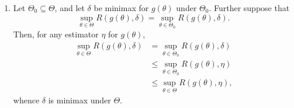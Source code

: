 \documentclass[11pt]{article}
\begin{document}
\begin{enumerate}



        \item Let $\Theta_0 \subseteq \Theta$, and let $\delta$ be minimax for
        $g(\theta)$ under $\Theta_0$.
        Further suppose that \[
            \sup_{\theta \in \Theta} R(g(\theta), \delta)
                = \sup_{\theta \in \Theta_0} R(g(\theta), \delta).
        \] Then, for any estimator $\eta$ for $g(\theta)$, \begin{align*}
            \sup_{\theta \in \Theta} R(g(\theta), \delta)
                &= \sup_{\theta \in \Theta_0} R(g(\theta), \delta) \\
                &\leq \sup_{\theta \in \Theta_0} R(g(\theta), \eta) \tag{$\delta$ minimax under $\Theta_0$} \\
                &\leq \sup_{\theta \in \Theta} R(g(\theta), \eta), \tag{Supremums}
        \end{align*}
        whence $\delta$ is minimax under $\Theta$.





\end{enumerate}
\end{document}
